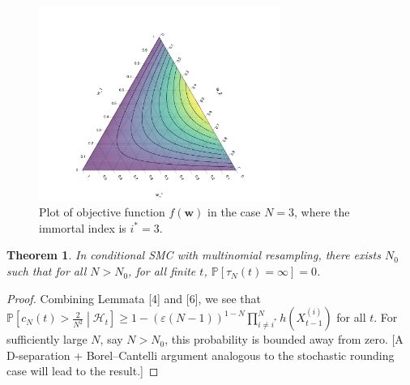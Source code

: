 \documentclass{article}
\newtheorem{thm}{Theorem}
\newcommand{\PR}{\mathbb{P}}
\begin{document}
\begin{figure}
\centering
\includegraphics[width=0.7\textwidth]{ternplot1.pdf}
\caption{Plot of objective function $f(\mathbf{w})$ in the case $N=3$, where the immortal index is $i^*=3$.}
\label{fig:CSMC_ternaryplot}
\end{figure}


\begin{thm}
In conditional SMC with multinomial resampling, there exists $N_0$ such that for all $N>N_0$, for all finite $t$, $\PR[\tau_N(t) = \infty] =0$.
\end{thm}


\begin{proof}
Combining Lemmata [4] and [6], we see that $\PR \left[c_N(t) > \frac{2}{N^2} \middle| \mathcal{H}_t \right] \geq 1- (\varepsilon(N-1))^{1-N} \prod_{i\neq i^*}^N h(X_{t-1}^{(i)})$ for all $t$. For sufficiently large $N$, say $N>N_0$, this probability is bounded away from zero.
[A D-separation + Borel--Cantelli argument analogous to the stochastic rounding case will lead to the result.]
\end{proof}
\end{document}
